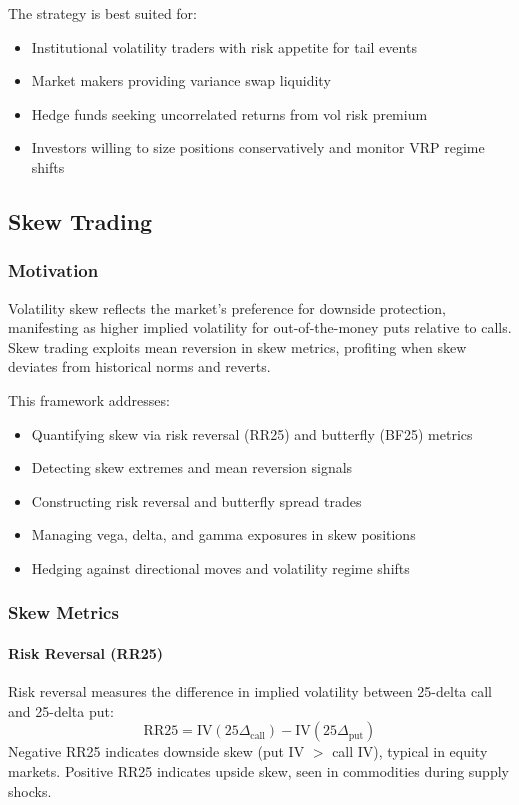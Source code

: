The strategy is best suited for:
\begin{itemize}
  \item Institutional volatility traders with risk appetite for tail events
  \item Market makers providing variance swap liquidity
  \item Hedge funds seeking uncorrelated returns from vol risk premium
  \item Investors willing to size positions conservatively and monitor VRP regime shifts
\end{itemize}

\subsection{Skew Trading}

\subsubsection{Motivation}

Volatility skew reflects the market's preference for downside protection, manifesting as higher implied volatility for out-of-the-money puts relative to calls. Skew trading exploits mean reversion in skew metrics, profiting when skew deviates from historical norms and reverts.

This framework addresses:
\begin{itemize}
  \item Quantifying skew via risk reversal (RR25) and butterfly (BF25) metrics
  \item Detecting skew extremes and mean reversion signals
  \item Constructing risk reversal and butterfly spread trades
  \item Managing vega, delta, and gamma exposures in skew positions
  \item Hedging against directional moves and volatility regime shifts
\end{itemize}

\subsubsection{Skew Metrics}

\paragraph{Risk Reversal (RR25)}

Risk reversal measures the difference in implied volatility between 25-delta call and 25-delta put:
\[
\text{RR25} = \text{IV}(25\Delta_{\text{call}}) - \text{IV}(25\Delta_{\text{put}})
\]
Negative RR25 indicates downside skew (put IV $>$ call IV), typical in equity markets. Positive RR25 indicates upside skew, seen in commodities during supply shocks.

